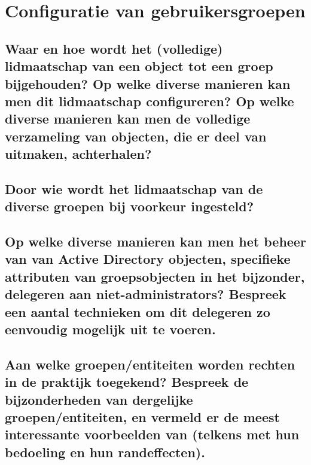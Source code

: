 \chapter{Configuratie van gebruikersgroepen}

\section{Waar en hoe wordt het (volledige) lidmaatschap van een object tot een
groep bijgehouden? Op welke diverse manieren kan men dit lidmaatschap
configureren? Op welke diverse manieren kan men de volledige verzameling van
objecten, die er deel van uitmaken, achterhalen?}

\section{Door wie wordt het lidmaatschap van de diverse groepen bij voorkeur
ingesteld?}

\section{Op welke diverse manieren kan men het beheer van van Active Directory
objecten, specifieke attributen van groepsobjecten in het bijzonder, delegeren
aan niet-administrators? Bespreek een aantal technieken om dit delegeren zo
eenvoudig mogelijk uit te voeren.}

\section{Aan welke groepen/entiteiten worden rechten in de praktijk toegekend?
Bespreek de bijzonderheden van dergelijke groepen/entiteiten, en vermeld er de
meest interessante voorbeelden van (telkens met hun bedoeling en hun
randeffecten).}
